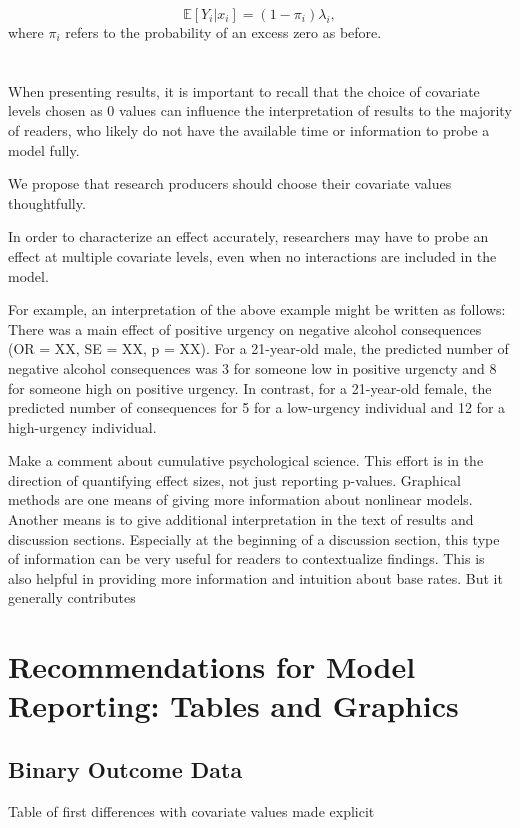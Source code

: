 \documentclass[jou, apacite]{apa6}
\begin{document}
\begin{equation} \label{zip4}
\mathbb{E}[Y_i|x_i] = (1 - \pi_i)\lambda_i,
\end{equation}
where $\pi_i$ refers to the probability of an excess zero as before.


\section{}
When presenting results, it is important to recall that the choice of covariate levels chosen as 0 values can influence the interpretation of results to the majority of readers, who likely do not have the available time or information to probe a model fully. 

We propose that research producers should choose their covariate values thoughtfully. 

In order to characterize an effect accurately, researchers may have to probe an effect at multiple covariate levels, even when no interactions are included in the model.

For example, an interpretation of the above example might be written as follows: There was a main effect of positive urgency on negative alcohol consequences (OR = XX, SE = XX, p = XX). For a 21-year-old male, the predicted number of negative alcohol consequences was 3 for someone low in positive urgencty and 8 for someone high on positive urgency. In contrast, for a 21-year-old female, the predicted number of consequences for 5 for a low-urgency individual and 12 for a high-urgency individual.

Make a comment about cumulative psychological science. This effort is in the direction of quantifying effect sizes, not just reporting p-values. Graphical methods are one means of giving more information about nonlinear models. Another means is to give additional interpretation in the text of results and discussion sections. Especially at the beginning of a discussion section, this type of information can be very useful for readers to contextualize findings. This is also helpful in providing more information and intuition about base rates. But it generally contributes 

\section{Recommendations for Model Reporting: Tables and Graphics}
\subsection{Binary Outcome Data}
Table of first differences with covariate values made explicit
\end{document}
